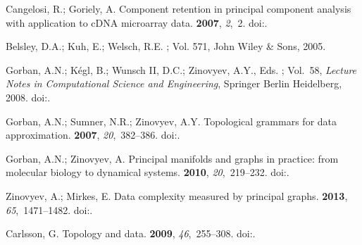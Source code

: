\documentclass[entropy,article,submit,moreauthors,pdftex]{Definitions/mdpi}
\begin{document}
\begin{thebibliography}{-------}
Cangelosi, R.; Goriely, A.
\newblock Component retention in principal component analysis with application
  to cDNA microarray data.
 {\bf 2007}, {\em 2},~2.
\newblock
  doi:{\href{https://doi.org/10.1186/1745-6150-2-2}{}}.

Belsley, D.A.; Kuh, E.; Welsch, R.E.
; Vol. 571, John Wiley \& Sons,  2005.

Gorban, A.N.; K{\'e}gl, B.; {Wunsch II}, D.C.; Zinovyev, A.Y., Eds.
; Vol.~58, {\em Lecture Notes in Computational Science and
  Engineering}, Springer Berlin Heidelberg,  2008.
\newblock
  doi:{\href{https://doi.org/10.1007/978-3-540-73750-6}{}}.

Gorban, A.N.; Sumner, N.R.; Zinovyev, A.Y.
\newblock Topological grammars for data approximation.
 {\bf 2007}, {\em 20},~382--386.
\newblock
  doi:{\href{https://doi.org/10.1016/j.aml.2006.04.022}{}}.

Gorban, A.N.; Zinovyev, A.
\newblock Principal manifolds and graphs in practice: from molecular biology to
  dynamical systems.
 {\bf 2010}, {\em 20},~219--232.
\newblock
  doi:{\href{https://doi.org/10.1142/s0129065710002383}{}}.

Zinovyev, A.; Mirkes, E.
\newblock Data complexity measured by principal graphs.
 {\bf 2013}, {\em 65},~1471--1482.
\newblock
  doi:{\href{https://doi.org/10.1016/j.camwa.2012.12.009}{}}.

Carlsson, G.
\newblock Topology and data.
 {\bf 2009}, {\em 46},~255--308.
\newblock
  doi:{\href{https://doi.org/10.1090/s0273-0979-09-01249-x}{}}.


\end{thebibliography}
\end{document}

